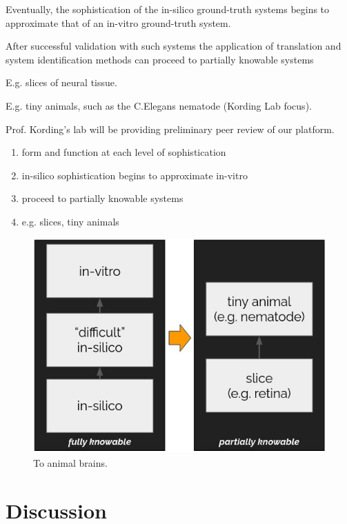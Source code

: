 \documentclass{ldr-article}
\begin{document}
Eventually, the sophistication of the in-silico ground-truth systems begins to approximate that of an in-vitro ground-truth system.

After successful validation with such systems the application of translation and system identification methods can proceed to partially knowable systems

E.g. slices of neural tissue.

E.g. tiny animals, such as the C.Elegans nematode (Kording Lab focus).

Prof. Kording’s lab will be providing preliminary peer review of our platform.

\begin{enumerate}
	\item form and function at each level of sophistication
	\item in-silico sophistication begins to approximate in-vitro
	\item proceed to partially knowable systems
	\item e.g. slices, tiny animals
\end{enumerate}

\begin{figure}
	\centering
	\includegraphics[width=1\linewidth]{figures/to-animal-brains.jpg}
	\caption{To animal brains.}
	\label{fig:to-animal-brains}
\end{figure}


\section{Discussion}
\end{document}
